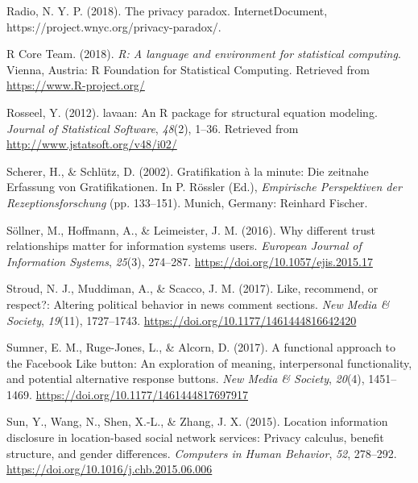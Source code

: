 \documentclass[
  english,
  man,floatsintext]{apa6}
\begin{document}
\leavevmode\hypertarget{ref-newyorkpublicradioPrivacyParadox2018}{}%
Radio, N. Y. P. (2018). The privacy paradox. InternetDocument, https://project.wnyc.org/privacy-paradox/.

\leavevmode\hypertarget{ref-R-base}{}%
R Core Team. (2018). \emph{R: A language and environment for statistical computing}. Vienna, Austria: R Foundation for Statistical Computing. Retrieved from \url{https://www.R-project.org/}

\leavevmode\hypertarget{ref-R-lavaan}{}%
Rosseel, Y. (2012). lavaan: An R package for structural equation modeling. \emph{Journal of Statistical Software}, \emph{48}(2), 1--36. Retrieved from \url{http://www.jstatsoft.org/v48/i02/}

\leavevmode\hypertarget{ref-schererGratifikationMinuteZeitnahe2002}{}%
Scherer, H., \& Schlütz, D. (2002). Gratifikation à la minute: Die zeitnahe Erfassung von Gratifikationen. In P. Rössler (Ed.), \emph{Empirische Perspektiven der Rezeptionsforschung} (pp. 133--151). Munich, Germany: Reinhard Fischer.

\leavevmode\hypertarget{ref-sollnerWhyDifferentTrust2016}{}%
Söllner, M., Hoffmann, A., \& Leimeister, J. M. (2016). Why different trust relationships matter for information systems users. \emph{European Journal of Information Systems}, \emph{25}(3), 274--287. \url{https://doi.org/10.1057/ejis.2015.17}

\leavevmode\hypertarget{ref-stroudRecommendRespectAltering2017}{}%
Stroud, N. J., Muddiman, A., \& Scacco, J. M. (2017). Like, recommend, or respect?: Altering political behavior in news comment sections. \emph{New Media \& Society}, \emph{19}(11), 1727--1743. \url{https://doi.org/10.1177/1461444816642420}

\leavevmode\hypertarget{ref-sumnerFunctionalApproachFacebook2017}{}%
Sumner, E. M., Ruge-Jones, L., \& Alcorn, D. (2017). A functional approach to the Facebook Like button: An exploration of meaning, interpersonal functionality, and potential alternative response buttons. \emph{New Media \& Society}, \emph{20}(4), 1451--1469. \url{https://doi.org/10.1177/1461444817697917}

\leavevmode\hypertarget{ref-sunLocationInformationDisclosure2015}{}%
Sun, Y., Wang, N., Shen, X.-L., \& Zhang, J. X. (2015). Location information disclosure in location-based social network services: Privacy calculus, benefit structure, and gender differences. \emph{Computers in Human Behavior}, \emph{52}, 278--292. \url{https://doi.org/10.1016/j.chb.2015.06.006}
\end{document}
